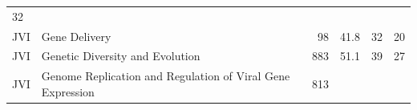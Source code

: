 \documentclass[11pt,]{article}
\begin{document}
\begin{longtable}[]{@{}llrrrr@{}}
\begin{minipage}[t]{0.11\columnwidth}
32\strut
\end{minipage}\tabularnewline
\begin{minipage}[t]{0.06\columnwidth}\raggedright\strut
JVI\strut
\end{minipage} & \begin{minipage}[t]{0.43\columnwidth}\raggedright\strut
Gene Delivery\strut
\end{minipage} & \begin{minipage}[t]{0.04\columnwidth}\raggedleft\strut
98\strut
\end{minipage} & \begin{minipage}[t]{0.08\columnwidth}\raggedleft\strut
41.8\strut
\end{minipage} & \begin{minipage}[t]{0.11\columnwidth}\raggedleft\strut
32\strut
\end{minipage} & \begin{minipage}[t]{0.11\columnwidth}\raggedleft\strut
20\strut
\end{minipage}\tabularnewline
\begin{minipage}[t]{0.06\columnwidth}\raggedright\strut
JVI\strut
\end{minipage} & \begin{minipage}[t]{0.43\columnwidth}\raggedright\strut
Genetic Diversity and Evolution\strut
\end{minipage} & \begin{minipage}[t]{0.04\columnwidth}\raggedleft\strut
883\strut
\end{minipage} & \begin{minipage}[t]{0.08\columnwidth}\raggedleft\strut
51.1\strut
\end{minipage} & \begin{minipage}[t]{0.11\columnwidth}\raggedleft\strut
39\strut
\end{minipage} & \begin{minipage}[t]{0.11\columnwidth}\raggedleft\strut
27\strut
\end{minipage}\tabularnewline
\begin{minipage}[t]{0.06\columnwidth}\raggedright\strut
JVI\strut
\end{minipage} & \begin{minipage}[t]{0.43\columnwidth}\raggedright\strut
Genome Replication and Regulation of Viral Gene Expression\strut
\end{minipage} & \begin{minipage}[t]{0.04\columnwidth}\raggedleft\strut
813\strut
\end{minipage} & \begin{minipage}[t]{0.08\columnwidth}\raggedleft\strut

\end{minipage}
\end{longtable}
\end{document}
